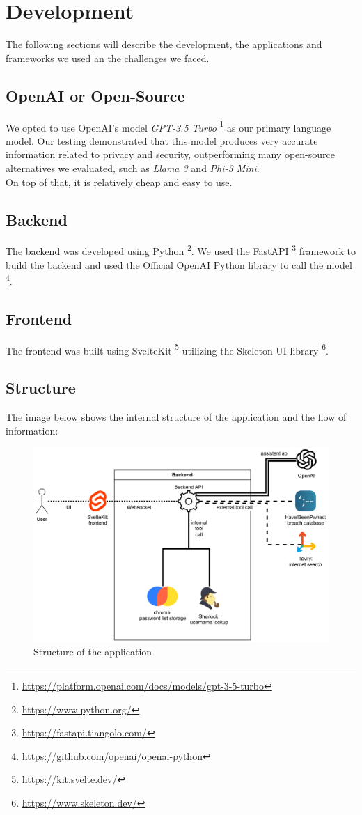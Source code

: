 \documentclass[
    a4paper,
    pagesize,
	pdftex,
    12pt,
]{scrartcl}
\begin{document}
\section{Development}
The following sections will describe the development, the applications and frameworks we used an the challenges we faced.

\subsection{OpenAI or Open-Source}
We opted to use OpenAI's model \textit{GPT-3.5 Turbo} \footnote{\url{https://platform.openai.com/docs/models/gpt-3-5-turbo}} as our primary language model. Our testing demonstrated that this model produces very accurate information related to privacy and security, outperforming many open-source alternatives we evaluated, such as \textit{Llama 3} and \textit{Phi-3 Mini}.\\
On top of that, it is relatively cheap and easy to use.

\subsection{Backend}
The backend was developed using Python \footnote{\url{https://www.python.org/}}. We used the FastAPI \footnote{\url{https://fastapi.tiangolo.com/}} framework to build the backend and used the Official OpenAI Python library to call the model \footnote{\url{https://github.com/openai/openai-python}}.

\subsection{Frontend}
The frontend was built using SvelteKit \footnote{\url{https://kit.svelte.dev/}} utilizing the Skeleton UI library \footnote{\url{https://www.skeleton.dev/}}.

\subsection{Structure}
The image below shows the internal structure of the application and the flow of information:
\begin{figure}[H]
	\centering
	\includegraphics[width=14cm]{Structure200.png}
	\caption{Structure of the application}
	\label{fig:structure}
\end{figure} 
\end{document}
